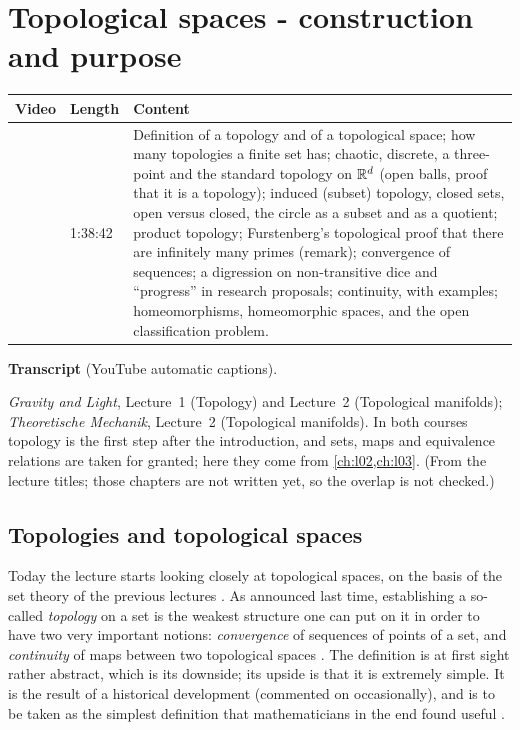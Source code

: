 \chapter{Topological spaces - construction and purpose}\label{ch:l04}
\begin{paracol}{2}

\begin{sources}
\begin{tabularx}{\linewidth}{@{}l l L@{}}
\toprule
\textbf{Video} & \textbf{Length} & \textbf{Content}\\
\midrule
{} & 1:38:42 & Definition of a topology and of a
topological space; how many topologies a finite set has; chaotic, discrete, a three-point and the standard topology on
$\mathbb{R}^d$ (open balls, proof that it is a topology); induced (subset) topology, closed sets, open versus closed, the circle
as a subset and as a quotient; product topology; Furstenberg's topological proof that there are infinitely many primes
(remark); convergence of sequences; a digression on non-transitive dice and ``progress'' in research proposals;
continuity, with examples; homeomorphisms, homeomorphic spaces, and the open classification problem.\\
\bottomrule
\end{tabularx}

\smallskip
\textbf{Transcript}  (YouTube automatic captions).
\end{sources}

\begin{reading}
\emph{Gravity and Light}, Lecture~1 (Topology) and Lecture~2 (Topological manifolds); \emph{Theoretische Mechanik},
Lecture~2 (Topological manifolds). In both courses topology is the first step after the introduction, and sets,
maps and equivalence relations are taken for granted; here they come from \cref{ch:l02,ch:l03}. (From the lecture
titles; those chapters are not written yet, so the overlap is not checked.)
\end{reading}

\section{Topologies and topological spaces}\label{sec:to-def}

Today the lecture starts looking closely at topological spaces, on the basis of the set theory of the previous
lectures . As announced last time, establishing a so-called \emph{topology} on a set is the weakest
structure one can put on it in order to have two very important notions: \emph{convergence} of sequences of points of
a set, and \emph{continuity} of maps between two topological spaces . The definition is at
first sight rather abstract, which is its downside; its upside is that it is extremely simple. It is the result of a
historical development (commented on occasionally), and is to be taken as the simplest definition that mathematicians
in the end found useful .


\end{paracol}
